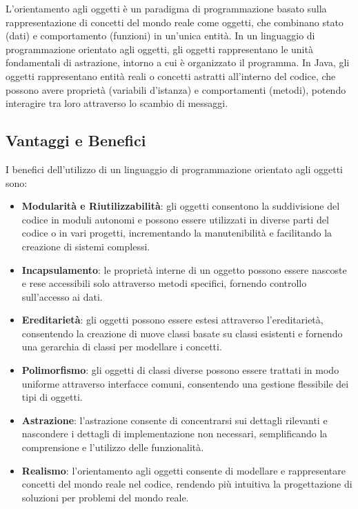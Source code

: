 L'orientamento agli oggetti è un paradigma di programmazione basato sulla rappresentazione di concetti del mondo reale come oggetti, che combinano stato (dati) e comportamento (funzioni) in un'unica entità. In un linguaggio di programmazione orientato agli oggetti, gli oggetti rappresentano le unità fondamentali di astrazione, intorno a cui è organizzato il programma.
In Java, gli oggetti rappresentano entità reali o concetti astratti all'interno del codice, che possono avere proprietà (variabili d'istanza) e comportamenti (metodi), potendo interagire tra loro attraverso lo scambio di messaggi.\cite{JAVA_unife}

\subsection{Vantaggi e Benefici}

I benefici dell’utilizzo di un linguaggio di programmazione orientato agli oggetti sono:
\begin{itemize}
    \item \textbf{Modularità e Riutilizzabilità}: gli oggetti consentono la suddivisione del codice in moduli autonomi e possono essere utilizzati in diverse parti del codice o in vari progetti, incrementando la manutenibilità e facilitando la creazione di sistemi complessi.\cite{JAVA_azionadigitale}
    \item \textbf{Incapsulamento}: le proprietà interne di un oggetto possono essere nascoste e rese accessibili solo attraverso metodi specifici, fornendo controllo sull’accesso ai dati.\cite{JAVA_educative}
    \item \textbf{Ereditarietà}: gli oggetti possono essere estesi attraverso l’ereditarietà, consentendo la creazione di nuove classi basate su classi esistenti e fornendo una gerarchia di classi per modellare i concetti.\cite{JAVA_educative}
    \item \textbf{Polimorfismo}: gli oggetti di classi diverse possono essere trattati in modo uniforme attraverso interfacce comuni, consentendo una gestione flessibile dei tipi di oggetti.\cite{JAVA_educative}
    \item \textbf{Astrazione}: l’astrazione consente di concentrarsi sui dettagli rilevanti e nascondere i dettagli di implementazione non necessari, semplificando la comprensione e l’utilizzo delle funzionalità.\cite{JAVA_educative}
    \item \textbf{Realismo}: l’orientamento agli oggetti consente di modellare e rappresentare concetti del mondo reale nel codice, rendendo più intuitiva la progettazione di soluzioni per problemi del mondo reale.
\end{itemize}



